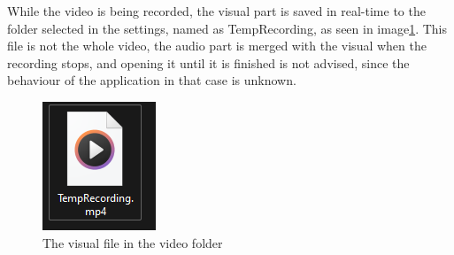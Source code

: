 \par While the video is being recorded, the visual part is saved in real-time to the folder selected in the settings, named as TempRecording, as seen in image\ref{fig:TempRecordingLooks}. This file is not the whole video, the audio part is merged with the visual when the recording stops, and opening it until it is finished is not advised, since the behaviour of the application in that case is unknown.

\begin{figure}
    \centering
    \includegraphics[width=0.15\linewidth]{figures/TempRecording.png}
    \caption{The visual file in the video folder}
    \label{fig:TempRecordingLooks}
\end{figure}